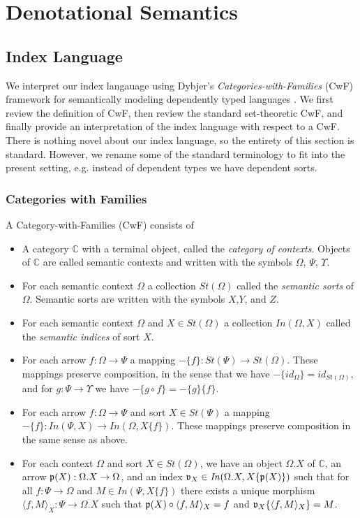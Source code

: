 \documentclass[sigplan,10pt,review,anonymous]{acmart}
\begin{document}
\section{Denotational Semantics}

\subsection{Index Language}

We interpret our index langauage using Dybjer's \emph{Categories-with-Families} (CwF) framework for semantically modeling dependently typed languages \cite{}. We first review the definition of CwF, then review the standard set-theoretic CwF, and finally provide an interpretation of the index language with respect to a CwF. There is nothing novel about our index language, so the entirety of this section is standard. However, we rename some of the standard terminology to fit into the present setting, e.g. instead of dependent types we have dependent sorts.

\subsubsection{Categories with Families}

A Category-with-Families (CwF) consists of 
\begin{itemize}
\item A category $\mathbb C$ with a terminal object, called the \emph{category of contexts}. Objects of $\mathbb C$ are called semantic contexts and written with the symbols $\Omega$, $\Psi$, $\Upsilon$.
\item For each semantic context $\Omega$ a collection $\mathit{St}(\Omega)$ called the \emph{semantic sorts} of $\Omega$. Semantic sorts are written with the symbols $X$,$Y$, and $Z$.
\item For each semantic context $\Omega$ and $X \in \mathit{St}(\Omega)$ a collection $\mathit{In}(\Omega,X)$ called the \emph{semantic indices} of sort $X$.
\item For each arrow $f : \Omega \to \Psi$ a mapping $- \{ f \} : \mathit{St}(\Psi) \to \mathit{St}(\Omega)$. These mappings preserve composition, in the sense that we have $- \{ \mathit{id}_{\Omega} \} = \mathit{id}_{\mathit{St}(\Omega)}$, and for $g : \Psi \to \Upsilon$ we have $- \{ g \circ f \} = - \{ g \} \{ f \}$.
\item For each arrow $f : \Omega \to \Psi$ and sort $X \in \mathit{St}(\Psi)$ a mapping $- \{ f \} : \mathit{In}(\Psi,X) \to \mathit{In}(\Omega,X \{ f \})$. These mappings preserve composition in the same sense as above.
\item For each context $\Omega$ and sort $X \in \mathit{St}(\Omega)$, we have an object $\Omega . X$ of $\mathbb C$, an arrow $\frak p(X) : \Omega . X \to \Omega$, and an index $\frak v_{X} \in \mathit{In}(\Omega . X, X \{ \frak p(X) \})$ such that for all $f : \Psi \to \Omega$ and $M \in \mathit{In}(\Psi, X \{ f \})$ there exists a unique morphism $\langle f , M \rangle_X : \Psi \to \Omega . X$ such that $\frak p(X) \circ \langle f , M \rangle_X = f$ and $\frak v_{X} \{ \langle f, M \rangle_X \} = M$.
\end{itemize}
\end{document}
